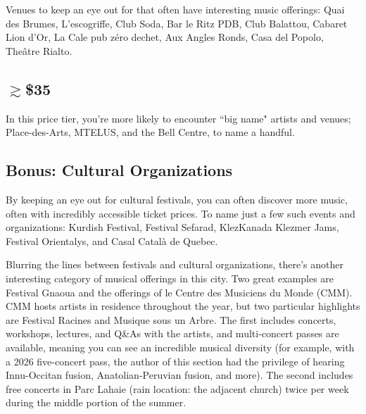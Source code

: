 Venues to keep an eye out for that often have interesting music offerings: Quai des Brumes, L'escogriffe, Club Soda, Bar le Ritz PDB, Club Balattou, Cabaret Lion d'Or, La Cale pub zéro dechet, Aux Angles Ronds, Casa del Popolo, Theâtre Rialto.

\subsection*{$\gtrsim$\$35}
In this price tier, you're more likely to encounter ``big name" artists and venues; Place-des-Arts, MTELUS, and the Bell Centre, to name a handful. 

\subsection*{Bonus: Cultural Organizations}
By keeping an eye out for cultural festivals, you can often discover more music, often with incredibly accessible ticket prices. To name just a few such events and organizations: Kurdish Festival, Festival Sefarad, KlezKanada Klezmer Jams, Festival Orientalys, and Casal Català de Quebec.

Blurring the lines between festivals and cultural organizations, there's another interesting category of musical offerings in this city. Two great examples are Festival Gnaoua and the offerings of le Centre des Musiciens du Monde (CMM). CMM hosts artists in residence throughout the year, but two particular highlights are Festival Racines and Musique sous un Arbre. The first includes concerts, workshops, lectures, and Q\&As with the artists, and multi-concert passes are available, meaning you can see an incredible musical diversity (for example, with a 2026 five-concert pass, the author of this section had the privilege of hearing Innu-Occitan fusion, Anatolian-Peruvian fusion, and more). The second includes free concerts in Parc Lahaie (rain location: the adjacent church) twice per week during the middle portion of the summer. 

